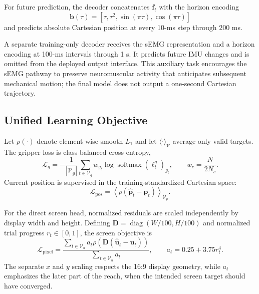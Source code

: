 For future prediction, the decoder concatenates $\mathbf f_t$ with the horizon
encoding
\begin{equation}
 \mathbf b(\tau)=[\tau,\tau^2,\sin(\pi\tau),\cos(\pi\tau)]
\end{equation}
and predicts absolute Cartesian position at every 10-ms step through 200 ms.

A separate training-only decoder receives the sEMG representation and a
horizon encoding at 100-ms intervals through 1 s. It predicts future IMU
changes and is omitted from the deployed output interface. This auxiliary task
encourages the sEMG pathway to preserve neuromuscular activity that anticipates
subsequent mechanical motion; the final model does not output a one-second
Cartesian trajectory.

\subsection{Unified Learning Objective}
\label{subsec:loss}

Let $\rho(\cdot)$ denote element-wise smooth-$L_1$ and let
$\langle\cdot\rangle_{\mathcal V}$ average only valid targets. The gripper loss
is class-balanced cross entropy,
\begin{equation}
 \mathcal L_g=-\frac{1}{|\mathcal V_g|}
 \sum_{t\in\mathcal V_g}w_{g_t}
 \log\operatorname{softmax}(\boldsymbol{\ell}_t^g)_{g_t},
 \qquad w_c=\frac{N}{2N_c}.
\end{equation}
Current position is supervised in the training-standardized Cartesian space:
\begin{equation}
 \mathcal L_{\mathrm{pos}}=
 \left\langle\rho(\hat{\mathbf p}_t-\mathbf p_t)\right\rangle_{\mathcal V_p}.
\end{equation}

For the direct screen head, normalized residuals are scaled independently by
display width and height. Defining
$\mathbf D=\operatorname{diag}(W/100,H/100)$ and normalized trial progress
$r_t\in[0,1]$, the screen objective is
\begin{equation}
 \mathcal L_{\mathrm{pixel}}=
 \frac{\sum_{t\in\mathcal V_u}a_t
 \rho\!\left(\mathbf D
 (\hat{\mathbf u}_t-\mathbf u_t)\right)}
 {\sum_{t\in\mathcal V_u}a_t},
 \qquad a_t=0.25+3.75r_t^4.
\end{equation}
The separate $x$ and $y$ scaling respects the 16:9 display geometry, while
$a_t$ emphasizes the later part of the reach, when the intended screen target
should have converged.

